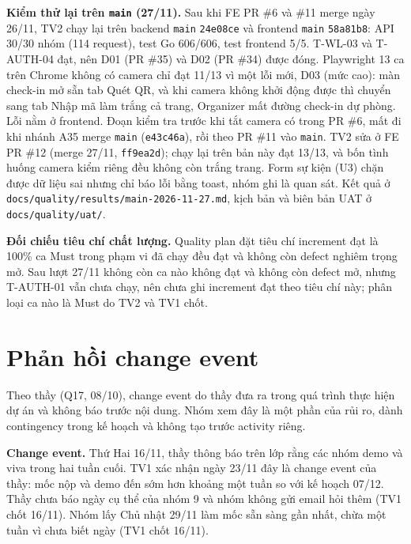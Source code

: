 \textbf{Kiểm thử lại trên \texttt{main} (27/11).} Sau khi FE PR \#6 và \#11 merge ngày 26/11, TV2 chạy lại trên backend \texttt{main} \texttt{24e08ce} và frontend \texttt{main} \texttt{58a81b8}: API 30/30 nhóm (114 request), test Go 606/606, test frontend 5/5. T-WL-03 và T-AUTH-04 đạt, nên D01 (PR \#35) và D02 (PR \#34) được đóng. Playwright 13 ca trên Chrome không có camera chỉ đạt 11/13 vì một lỗi mới, D03 (mức cao): màn check-in mở sẵn tab Quét QR, và khi camera không khởi động được thì chuyển sang tab Nhập mã làm trắng cả trang, Organizer mất đường check-in dự phòng. Lỗi nằm ở frontend. Đoạn kiểm tra trước khi tắt camera có trong PR \#6, mất đi khi nhánh A35 merge \texttt{main} (\texttt{e43c46a}), rồi theo PR \#11 vào \texttt{main}. TV2 sửa ở FE PR \#12 (merge 27/11, \texttt{ff9ea2d}); chạy lại trên bản này đạt 13/13, và bốn tình huống camera kiểm riêng đều không còn trắng trang. Form sự kiện (U3) chặn được dữ liệu sai nhưng chỉ báo lỗi bằng toast, nhóm ghi là quan sát. Kết quả ở \texttt{docs/\allowbreak quality/\allowbreak results/\allowbreak main-2026-11-27.md}, kịch bản và biên bản UAT ở \texttt{docs/\allowbreak quality/\allowbreak uat/}.

\textbf{Đối chiếu tiêu chí chất lượng.} Quality plan đặt tiêu chí increment đạt là 100\% ca Must trong phạm vi đã chạy đều đạt và không còn defect nghiêm trọng mở. Sau lượt 27/11 không còn ca nào không đạt và không còn defect mở, nhưng T-AUTH-01 vẫn chưa chạy, nên chưa ghi increment đạt theo tiêu chí này; phân loại ca nào là Must do TV2 và TV1 chốt.


\section{Phản hồi change event}
\label{sec:3-6}
Theo thầy (Q17, 08/10), change event do thầy đưa ra trong quá trình thực hiện dự án và không báo trước nội dung. Nhóm xem đây là một phần của rủi ro, dành contingency trong kế hoạch và không tạo trước activity riêng.

\textbf{Change event.} Thứ Hai 16/11, thầy thông báo trên lớp rằng các nhóm demo và viva trong hai tuần cuối. TV1 xác nhận ngày 23/11 đây là change event của thầy: mốc nộp và demo đến sớm hơn khoảng một tuần so với kế hoạch 07/12. Thầy chưa báo ngày cụ thể của nhóm 9 và nhóm không gửi email hỏi thêm (TV1 chốt 16/11). Nhóm lấy Chủ nhật 29/11 làm mốc sẵn sàng gần nhất, chừa một tuần vì chưa biết ngày (TV1 chốt 16/11).

